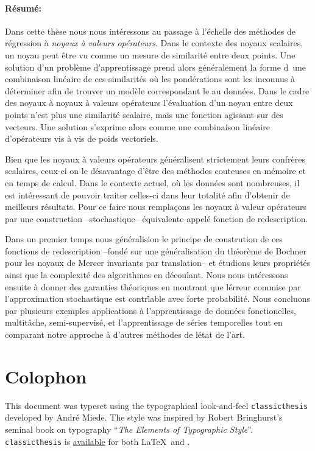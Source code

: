 \paragraph{R\'esum\'e:} Dans cette th\`ese nous nous int\'eressons au passage \`a l'\'echelle des m\'ethodes de r\'egression \`a \emph{noyaux \`a valeurs op\'erateurs}. Dans le contexte des noyaux scalaires, un noyau peut \^etre vu comme un mesure de similarit\'e entre deux points. Une solution d'un probl\`eme d'apprentissage prend alors g\'en\'eralement la forme d\ une combinaison lin\'eaire de ces similarit\'es o\`u les pond\'erations sont les inconnus \`a d\'eterminer afin de trouver un mod\`ele correspondant le  au donn\'ees. Dans le cadre des noyaux \`a noyaux \`a valeurs op\'erateurs l'\'evaluation d'un noyau entre deux points n'est plus une similarit\'e scalaire, mais une fonction agissant sur des vecteurs. Une solution s'exprime alors comme une combinaison lin\'eaire d'op\'erateurs vis \`a vis de poids vectoriels.

Bien que les noyaux \`a valeurs op\'erateurs g\'en\'eralisent strictement leurs confr\`eres sca\-lai\-res, ceux-ci on le d\'esavantage d'\^etre des m\'ethodes couteuses en m\'emoire et en temps de calcul. Dans le contexte actuel, o\`u les donn\'ees sont nombreuses, il est int\'eressant de pouvoir traiter celles-ci dans leur totalit\'e afin d'obtenir de meilleurs r\'esultats. Pour ce faire nous rempla\c cons les noyaux \`a valeur op\'erateurs par une construction --stochastique-- \'equivalente appel\'e fonction de redescription.

Dans un premier temps nous g\'en\'eralision le principe de constrution de ces fonctions de redescription --fond\'e sur une g\'en\'eralisation du th\'eor\`eme de Bochner pour les noyaux de Mercer invariants par translation-- et \'etudions leurs propri\'et\'es ainsi que la complexit\'e des algorithmes en d\'ecoulant. Nous nous int\'eressons ensuite \`a donner des garanties th\'eoriques en montrant que l\'erreur commise par l'approximation stochastique est contr\^lable avec forte probabilit\'e. Nous concluons par plusieurs exemples applications \`a l'apprentissage de donn\'ees fonctionelles, multit\^ache, semi-supervis\'e, et l'apprentissage de s\'eries temporelles tout en comparant notre approche \`a d'autres m\'ethodes de l\'etat de l'art.

\section*{Colophon}
This document was typeset using the typographical look-and-feel \texttt{cla\-ssic\-the\-sis} developed by Andr\'e Miede. The style was inspired by Robert Bringhurst's seminal book on typography ``\emph{The Elements of Typographic Style}''. \texttt{cla\-ssic\-the\-sis} is \href{https://bitbucket.org/amiede/classicthesis/}{available} for both \LaTeX\ and \mLyX.

\bigskip

\noindent\finalVersionString
